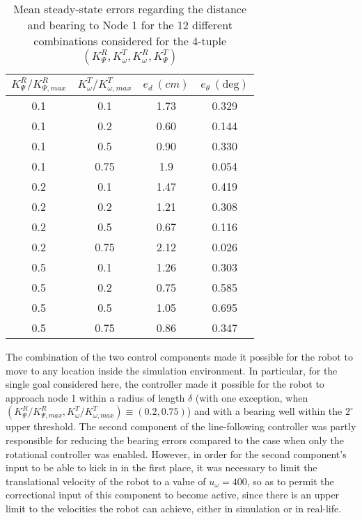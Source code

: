 \begin{table}[H]\centering
    \begin{tabular}{c|c|c|c}
    $K_{\Psi}^R / K_{\Psi,max}^R$ & $K_{\omega}^T / K_{\omega,max}^T$ & $e_{d}\ (cm)$  & $e_{\theta}\ (\text{deg})$ \\ \hline
    0.1        & 0.1          & 1.73    & 0.329     \\
    0.1        & 0.2          & 0.60    & 0.144     \\
    0.1        & 0.5          & 0.90    & 0.330     \\
    0.1        & 0.75         & 1.9     & 0.054     \\
    0.2        & 0.1          & 1.47    & 0.419     \\
    0.2        & 0.2          & 1.21    & 0.308     \\
    0.2        & 0.5          & 0.67    & 0.116     \\
    0.2        & 0.75         & 2.12    & 0.026     \\
    0.5        & 0.1          & 1.26    & 0.303     \\
    0.5        & 0.2          & 0.75    & 0.585     \\
    0.5        & 0.5          & 1.05    & 0.695     \\
    0.5        & 0.75         & 0.86    & 0.347     \\
    \end{tabular}
    \caption{Mean steady-state errors regarding the distance and bearing to Node
      1 for the 12 different combinations considered for the 4-tuple
      $(K_{\Psi}^R, K_{\omega}^T, K_{\omega}^R, K_{\Psi}^T)$}
    \label{tbl:19_errors}
\end{table}


The combination of the two control components made it possible for the robot
to move to any location inside the simulation environment. In particular, for
the single goal considered here, the controller made it possible for the robot
to approach node 1 within a radius of length $\delta$ (with one exception, when
$(K_{\Psi}^R / K_{\Psi,max}^R, K_{\omega}^T / K_{\omega,max}^T) \equiv (0.2, 0.75)$)
and with a bearing well within the $2^{\circ}$ upper threshold. The second
component of the line-following controller was partly responsible for reducing
the bearing errors compared to the case when only the rotational controller was
enabled. However, in order for the second component's input to be able to kick
in in the first place, it was necessary to limit the translational velocity of
the robot to a value of $u_{\omega} = 400$, so as to permit the correctional
input of this component to become active, since there is an upper limit to the
velocities the robot can achieve, either in simulation or in real-life.

